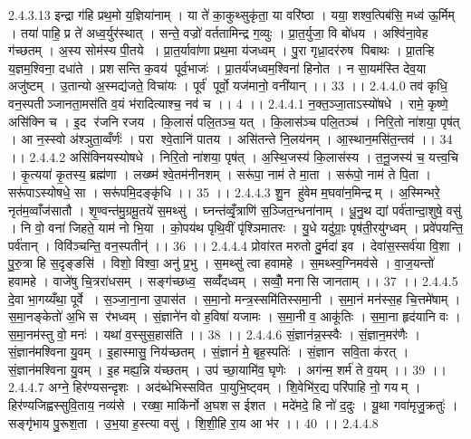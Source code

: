 2.4.3.13
इन्द्रा ग॑हि प्रथ॒मो य॒ज्ञिया॑नाम् । या ते॑ का॒कुथ्सुकृ॑ता॒ या वरि॑ष्ठा । यया॒ शश्व॒त्पिब॑सि॒ मध्व॑ ऊ॒र्मिम् । तया॑ पाहि॒ प्र ते॑ अध्व॒र्युर॑स्थात् । सन्ते॒ वज्रो॑ वर्ततामिन्द्र ग॒व्युः । प्रा॒त॒र्युजा॒ वि बो॑धय । अश्वि॑ना॒वेह ग॑च्छतम् । अ॒स्य सोम॑स्य पी॒तये । प्रा॒त॒र्यावा॑णा प्रथ॒मा य॑जध्वम् । पु॒रा गृध्रा॒दर॑रुष पिबाथः । प्रा॒तऱ्हि य॒ज्ञम॒श्विना॒ दधा॑ते । प्रश॑सन्ति क॒वय॑ पूर्व॒भाजः॑ । प्रा॒तर्य॑जध्वम॒श्विना॑ हिनोत । न सा॒यम॑स्ति देव॒या अजु॑ष्टम् । उ॒तान्यो अ॒स्मद्य॑जते॒ विचा॑यः । पूर्व॑ पूर्वो॒ यज॑मानो॒ वनी॑यान् ।। 33 ।।
2.4.4.0
तव॑ कृधि॒ वन॒स्पतीञ्जानता॒मस॑ति व॒यं भ॑रादित्याश्च॒ नव॑ च ।। 4 ।।
2.4.4.1
न॒क्त॒ञ्जा॒ताऽस्यो॑षधे । रामे॒ कृष्णे॒ असि॑क्नि च । इ॒द र॑जनि रजय । कि॒लासं॑ पलि॒तञ्च॒ यत् । कि॒लास॑ञ्च पलि॒तञ्च॑ । निरि॒तो ना॑शया॒ पृष॑त् । आ न॒स्स्वो अ॑श्ञुता॒व्वँर्णः॑ । परा श्वे॒तानि॑ पातय । असि॑तन्ते नि॒लय॑नम् । आ॒स्थान॒मसि॑त॒न्तव॑ ।। 34 ।।
2.4.4.2
असि॑क्नियस्योषधे । निरि॒तो ना॑शया॒ पृष॑त् । अ॒स्थि॒जस्य॑ कि॒लास॑स्य । त॒नू॒जस्य॑ च॒ यत्त्व॒चि । कृ॒त्यया॑ कृ॒तस्य॒ ब्रह्म॑णा । लख्ष्म॑ श्वे॒तम॑नीनशम् । सरू॑पा॒ नाम॑ ते मा॒ता । सरू॑पो॒ नाम॑ ते पि॒ता । सरू॑पाऽस्योषधे॒ सा । सरू॑पमि॒दङ्कृ॑धि ।। 35 ।।
2.4.4.3
शु॒न हु॑वेम म॒घवा॑न॒मिन्द्रम् । अ॒स्मिन्भरे॒ नृत॑म॒व्वाँज॑सातौ । शृ॒ण्वन्त॑मु॒ग्रमू॒तये॑ स॒मथ्सु॑ । घ्नन्त॑व्वृँ॒त्राणि॑ स॒ञ्जित॒न्धना॑नाम् । धू॒नु॒थ द्यां पर्व॑तान्दा॒शुषे॒ वसु॑ । नि वो॒ वना॑ जिहते॒ याम॑ नो भि॒या । को॒पय॑थ पृथि॒वीं पृ॑श्ञिमातरः । यु॒धे यदु॑ग्राः॒ पृष॑ती॒रयु॑ग्ध्वम् । प्रवे॑पयन्ति॒ पर्व॑तान् । विवि॑ञ्चन्ति॒ वन॒स्पतीन्॑ ।। 36 ।।
2.4.4.4
प्रोवा॑रत मरुतो दु॒र्मदा॑ इव । देवा॑स॒स्सर्व॑या वि॒शा । पु॒रु॒त्रा हि स॒दृङ्ङसि॑ । विशो॒ विश्वा॒ अनु॑ प्र॒भु । स॒मथ्सु॑ त्वा हवामहे । स॒मथ्स्व॒ग्निमव॑से । वा॒ज॒यन्तो॑ हवामहे । वाजे॑षु चि॒त्ररा॑धसम् । सङ्ग॑च्छध्व॒॒ सव्वँ॑दध्वम् । सव्वोँ॒ मना॑सि जानताम् ।। 37 ।।
2.4.4.5
दे॒वा भा॒गय्यँथा॒ पूर्वे । स॒ञ्जा॒ना॒ना उ॒पास॑त । स॒मा॒नो मन्त्र॒स्समि॑तिस्समा॒नी । स॒मा॒नं मन॑स्स॒ह चि॒त्तमे॑षाम् । स॒मा॒नङ्केतो॑ अ॒भि स र॑भध्वम् । सं॒ज्ञाने॑न वो ह॒विषा॑ यजामः । स॒मा॒नी व॒ आकू॑तिः । स॒मा॒ना हृद॑यानि वः । स॒मा॒नम॑स्तु वो॒ मनः॑ । यथा॑ व॒स्सुस॒हास॑ति ।। 38 ।।
2.4.4.6
सं॒ज्ञान॑न्न॒स्स्वैः । सं॒ज्ञान॒मर॑णैः । सं॒ज्ञान॑मश्विना यु॒वम् । इ॒हास्मासु॒ निय॑च्छतम् । सं॒ज्ञानं॑ मे॒ बृह॒स्पतिः॑ । सं॒ज्ञान॑ सवि॒ता क॑रत् । सं॒ज्ञान॑मश्विना यु॒वम् । इ॒ह मह्य॒न्नि य॑च्छतम् । उप॑ च्छा॒यामि॑व॒ घृणेः । अग॑न्म॒ शर्म॑ ते व॒यम् ।। 39 ।।
2.4.4.7
अग्ने॒ हिर॑ण्यसन्दृशः । अद॑ब्धेभिस्सवित पा॒युभि॒ष्ट्वम् । शि॒वेभि॑र॒द्य परि॑पाहि नो॒ गयम् । हिर॑ण्यजिह्वस्सुवि॒ताय॒ नव्य॑से । रख्षा॒ माकि॑र्नो अ॒घश॑स ईशत । मदे॑मदे॒ हि नो॑ द॒दुः । यू॒था गवा॑मृजु॒क्रतुः॑ । सङ्गृ॑भाय पु॒रूश॒ता । उ॒भ॒या ह॒स्त्या वसु॑ । शि॒शी॒हि रा॒य आ भ॑र ।। 40 ।।
2.4.4.8
